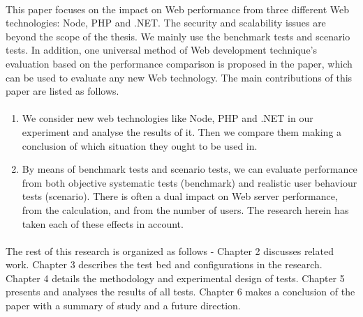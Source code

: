 \documentclass[../thesis.tex]{subfiles}
\begin{document}
\paragraph{}
This paper focuses on the impact on Web performance from three different Web technologies: Node, PHP and .NET. The security and scalability issues are beyond the scope of the thesis. We mainly use the benchmark tests and scenario tests. In addition, one universal method of Web development technique’s evaluation based on the performance comparison is proposed in the paper, which can be used to evaluate any new Web technology. The main contributions of this paper are listed as follows. 
\paragraph{}
\begin{enumerate}
    \item We consider new web technologies like Node, PHP and .NET in our experiment and analyse the results of it. Then we compare them making a conclusion of which situation they ought to be used in. 
    \item By means of benchmark tests and scenario tests, we can evaluate performance from both objective systematic tests (benchmark) and realistic user behaviour tests (scenario). There is often a dual impact on Web server performance, from the calculation, and from the number of users. The research herein has taken each of these effects in account.
\end{enumerate} 
\paragraph{}

The rest of this research is organized as follows - Chapter 2 discusses related work. Chapter 3 describes the test bed and configurations in the research. Chapter 4 details the methodology and experimental design of tests. Chapter 5 presents and analyses the results of all tests. Chapter 6 makes a conclusion of the paper with a summary of study and a future direction.
\end{document}
